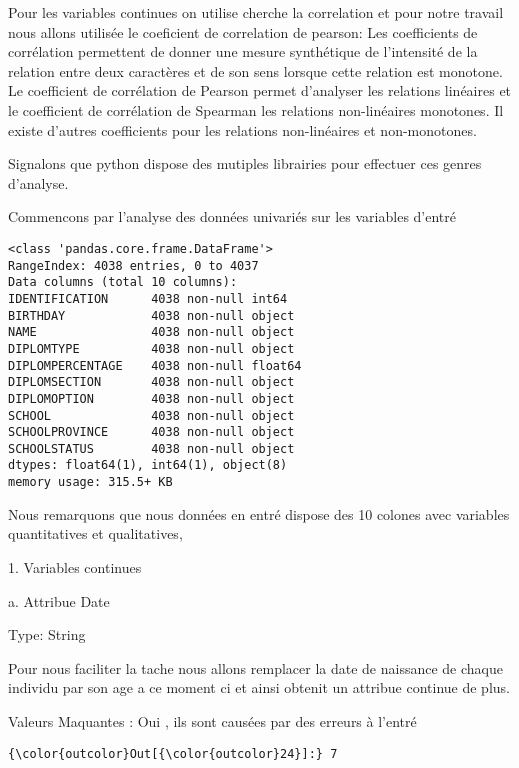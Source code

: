 \documentclass[11pt]{article}
\begin{document}
Pour les variables continues on utilise cherche la correlation et pour
notre travail nous allons utilisée le coeficient de correlation de
pearson: Les coefficients de corrélation permettent de donner une mesure
synthétique de l'intensité de la relation entre deux caractères et de
son sens lorsque cette relation est monotone. Le coefficient de
corrélation de Pearson permet d'analyser les relations linéaires et le
coefficient de corrélation de Spearman les relations non-linéaires
monotones. Il existe d'autres coefficients pour les relations
non-linéaires et non-monotones.

Signalons que python dispose des mutiples librairies pour effectuer ces
genres d'analyse.

    Commencons par l'analyse des données univariés sur les variables d'entré

    \begin{Verbatim}[commandchars=\\\{\}]
<class 'pandas.core.frame.DataFrame'>
RangeIndex: 4038 entries, 0 to 4037
Data columns (total 10 columns):
IDENTIFICATION      4038 non-null int64
BIRTHDAY            4038 non-null object
NAME                4038 non-null object
DIPLOMTYPE          4038 non-null object
DIPLOMPERCENTAGE    4038 non-null float64
DIPLOMSECTION       4038 non-null object
DIPLOMOPTION        4038 non-null object
SCHOOL              4038 non-null object
SCHOOLPROVINCE      4038 non-null object
SCHOOLSTATUS        4038 non-null object
dtypes: float64(1), int64(1), object(8)
memory usage: 315.5+ KB

    \end{Verbatim}

    Nous remarquons que nous données en entré dispose des 10 colones avec
variables quantitatives et qualitatives,

    1. Variables continues

a. Attribue Date

    Type: String

    Pour nous faciliter la tache nous allons remplacer la date de naissance
de chaque individu par son age a ce moment ci et ainsi obtenit un
attribue continue de plus.

    Valeurs Maquantes : Oui , ils sont causées par des erreurs à l'entré

            \begin{Verbatim}[commandchars=\\\{\}]
{\color{outcolor}Out[{\color{outcolor}24}]:} 7
\end{Verbatim}
        
\end{document}
